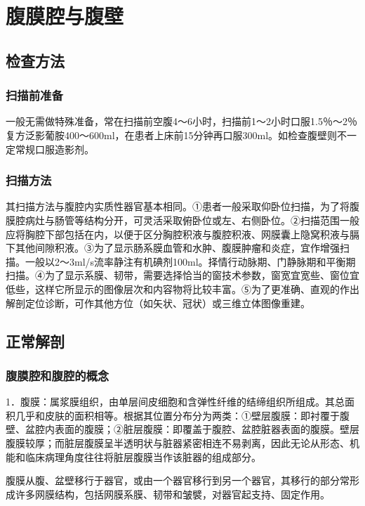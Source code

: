 \chapter{腹膜腔与腹壁}

\section{检查方法}

\subsection{扫描前准备}

一般无需做特殊准备，常在扫描前空腹4～6小时，扫描前1～2小时口服1.5％～2％复方泛影葡胺400～600ml，在患者上床前15分钟再口服300ml。如检查腹壁则不一定常规口服造影剂。

\subsection{扫描方法}

其扫描方法与腹腔内实质性器官基本相同。①患者一般采取仰卧位扫描，为了将腹膜腔病灶与肠管等结构分开，可灵活采取俯卧位或左、右侧卧位。②扫描范围一般应将胸腔下部包括在内，以便于区分胸腔积液与腹腔积液、网膜囊上隐窝积液与膈下其他间隙积液。③为了显示肠系膜血管和水肿、腹膜肿瘤和炎症，宜作增强扫描。一般以2～3ml/s流率静注有机碘剂100ml。择情行动脉期、门静脉期和平衡期扫描。④为了显示系膜、韧带，需要选择恰当的窗技术参数，窗宽宜宽些、窗位宜低些，这样它所显示的图像层次和内容物将比较丰富。⑤为了更准确、直观的作出解剖定位诊断，可作其他方位（如矢状、冠状）或三维立体图像重建。

\section{正常解剖}

\subsection{腹膜腔和腹腔的概念}

1．腹膜：属浆膜组织，由单层间皮细胞和含弹性纤维的结缔组织所组成。其总面积几乎和皮肤的面积相等。根据其位置分布分为两类：①壁层腹膜：即衬覆于腹壁、盆腔内表面的腹膜；②脏层腹膜：即覆盖于腹腔、盆腔脏器表面的腹膜。壁层腹膜较厚；而脏层腹膜呈半透明状与脏器紧密相连不易剥离，因此无论从形态、机能和临床病理角度往往将脏层腹膜当作该脏器的组成部分。

腹膜从腹、盆壁移行于器官，或由一个器官移行到另一个器官，其移行的部分常形成许多网膜结构，包括网膜系膜、韧带和皱襞，对器官起支持、固定作用。

